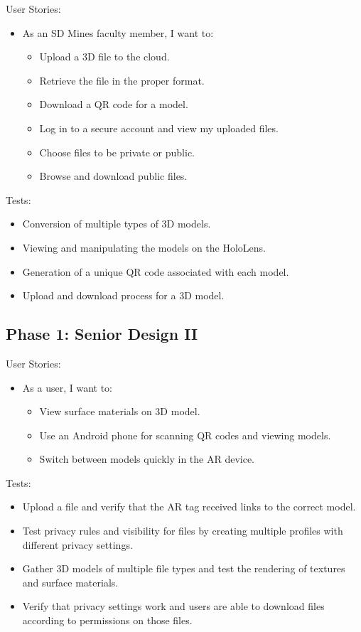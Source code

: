 User Stories:
\begin{itemize}
	\item As an SD Mines faculty member, I want to:
		\begin{itemize}
			\item Upload a 3D file to the cloud.
			\item Retrieve the file in the proper format.
			\item Download a QR code for a model.
			\item Log in to a secure account and view my uploaded files.
			\item Choose files to be private or public.
			\item Browse and download public files.
		\end{itemize}
\end{itemize}
Tests:
\begin{itemize}
	\item Conversion of multiple types of 3D models.
	\item Viewing and manipulating the models on the HoloLens.
	\item Generation of a unique QR code associated with each model.
	\item Upload and download process for a 3D model.
\end{itemize}

\subsection{Phase 1: Senior Design II}

User Stories:
\begin{itemize}
	\item As a user, I want to:
	\begin{itemize}
		\item View surface materials on 3D model.
		\item Use an Android phone for scanning QR codes and viewing models.
		\item Switch between models quickly in the AR device.
	\end{itemize}
\end{itemize}
Tests:
\begin{itemize}
	\item Upload a file and verify that the AR tag received links to the correct
	model.
	\item Test privacy rules and visibility for files by creating multiple 
	profiles with different privacy settings.
	\item Gather 3D models of multiple file types and test the rendering of 
	textures and surface materials.
	\item Verify that privacy settings work and users are able to download files
	according to permissions on those files.
\end{itemize}